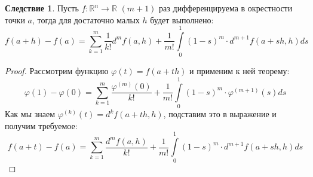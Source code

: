 \documentclass[12pt]{article}
\newcommand{\MR}{\mathbb{R}}
\theoremstyle{definition}
\newtheorem{corollary}{Следствие}
\newcommand{\ddint}[2]{\displaystyle\int\limits_{#1}^{#2}}
\begin{document}
\begin{corollary}
	Пусть $f \colon \MR^n \to \MR$ $(m+1)$ раз дифференцируема в окрестности точки $a$, тогда для достаточно малых $h$ будет выполнено:
	$$
		f(a + h) - f(a)  =  \displaystyle\sum\limits_{k=1}^m \dfrac{1}{k!}d^mf(a,h) + \dfrac{1}{m!}\ddint{0}{1}(1-s)^m{\cdot}d^{m+1}f(a + sh, h)ds
	$$
\end{corollary}
\begin{proof}
	Рассмотрим функцию $\varphi(t) = f(a+th)$ и применим к ней теорему:
	$$
		\varphi(1) - \varphi(0) = \displaystyle\sum\limits_{k=1}^m\dfrac{\varphi^{(m)}(0)}{k!} + \dfrac{1}{m!}\ddint{0}{1}(1-s)^m{\cdot}\varphi^{(m+1)}(s)ds
	$$
	Как мы знаем $\varphi^{(k)}(t) = d^kf(a+ th,h)$, подставим это в выражение и получим требуемое:
	$$
		f(a+t) - f(a) = \displaystyle\sum\limits_{k=1}^m\dfrac{d^mf(a,h)}{k!} + \dfrac{1}{m!}\ddint{0}{1}(1-s)^m{\cdot}d^{m+1}f(a + sh, h)ds
	$$
\end{proof}

\newpage
\end{document}

